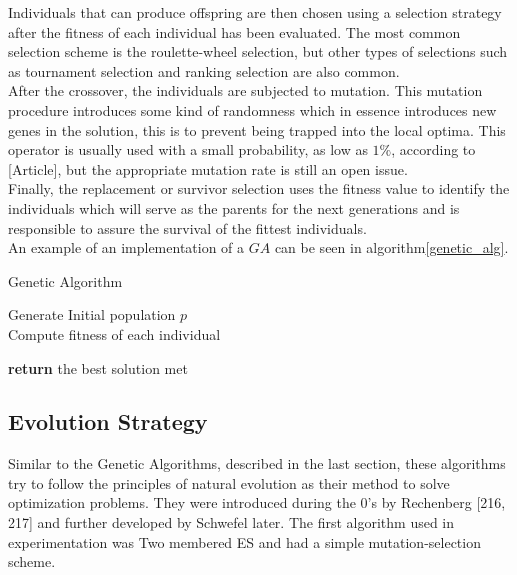 Individuals that can produce offspring are then chosen using a selection strategy after the fitness of each individual has been evaluated. The most common selection scheme is the roulette-wheel selection, but other types of selections such as tournament selection and ranking selection are also common.\\

After the crossover, the individuals are subjected to mutation. This mutation procedure introduces some kind of randomness which in essence introduces new genes in the solution, this is to prevent being trapped into the local optima. This operator is usually used with a small probability, as low as $1\%$, according to [Article], but the appropriate mutation rate is still an open issue.\\

Finally, the replacement or survivor selection uses the fitness value to identify the individuals which will serve as the parents for the next generations and is responsible to assure the survival of the fittest individuals.\\

An example of an implementation of a $GA$ can be seen in algorithm\ref{genetic_alg}.

\begin{algorithm}[H]
\label{genetic_alg}
\caption{Genetic Algorithm}
\SetAlgoLined 
Generate Initial population $p$\;\\
Compute fitness of each individual\;\

 \textbf{return} the best solution met\;
\end{algorithm}

\subsection{Evolution Strategy}

Similar to the Genetic Algorithms, described in the last section, these algorithms try to follow the principles of natural evolution as their method to solve optimization problems. They were introduced during the 0's by Rechenberg [216, 217] and further developed by Schwefel later. The first algorithm used in experimentation was Two membered ES and had a simple mutation-selection scheme.

